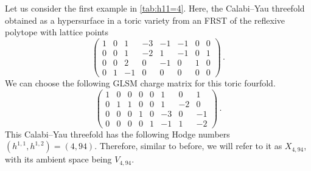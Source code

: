 \documentclass[11pt,dvipsnames]{article}
\theoremstyle{definition}
\begin{document}
Let us consider the first example in \cref{tab:h11=4}. Here, the Calabi--Yau threefold obtained as a hypersurface in a toric variety from an FRST of the reflexive polytope with lattice points
\begin{equation}
    \begin{pmatrix}
        1&0&1&-3&-1&-1&0&0\\
        0&0&1&-2&1&-1&0&1\\
        0&0&2&0&-1&0&1&0\\
        0&1&-1&0&0&0&0&0
    \end{pmatrix}\,.
\end{equation}
We can choose the following GLSM charge matrix for this toric fourfold.
\begin{equation}
\label{eq:x494 GLSM}
\begin{pmatrix}
    1&0&0&0&0&1&0&1\\
    0&1&1&0&0&1&-2&0\\
    0&0&0&1&0&-3&0&-1\\
    0&0&0&0&1&-1&1&-2
\end{pmatrix}\,.
\end{equation}
This Calabi--Yau threefold has the following Hodge numbers $(h^{1,1},h^{1,2})=(4,94)$. Therefore, similar to before, we will refer to it as $X_{4,94}$, with its ambient space being $V_{4,94}$. 
\end{document}
